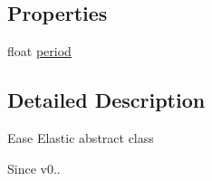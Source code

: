 \subsection*{Properties}
\begin{DoxyCompactItemize}
\item 
float \hyperlink{interface_c_c_ease_elastic_a11ec74f9a6af505355448f67bfa1cdb4}{period}
\end{DoxyCompactItemize}


\subsection{Detailed Description}
Ease Elastic abstract class \begin{DoxySince}{Since}
v0.. 
\end{DoxySince}


